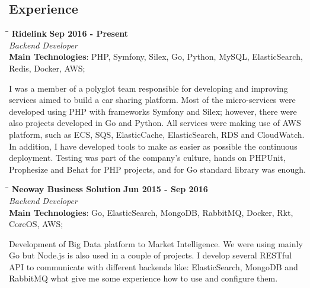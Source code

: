 \documentclass[margin]{res}
\begin{document}
\begin{resume}
\section{Experience}
\vspace{-0.1in}
    \begin{tabbing}
    \hspace{2.3in}\= \hspace{1.7in}\= \kill %
    \textbf{Ridelink}    \>\>\textbf{Sep 2016 - Present}\\
    \textit{Backend Developer}\\
    \textbf{Main Technologies}: PHP, Symfony, Silex, Go, Python, MySQL, ElasticSearch, \\Redis, Docker, AWS;
    \end{tabbing}\vspace{-20pt}      %
    \vspace{2mm}
I was a member of a polyglot team responsible for developing and improving services aimed to build a car sharing platform. Most of the micro-services were developed using PHP with frameworks Symfony and Silex; however, there were also projects developed in Go and Python. All services were making use of AWS platform, such as ECS, SQS, ElasticCache, ElasticSearch, RDS and CloudWatch. In addition, I have developed tools to make as easier as possible the continuous deployment. Testing was part of the company’s culture, hands on PHPUnit, Prophesize and Behat for PHP projects, and for Go standard library was enough.    

\vspace{-0.1in}
    \begin{tabbing}
    \hspace{2.3in}\= \hspace{1.7in}\= \kill %
    \textbf{Neoway Business Solution}    \>\>\textbf{Jun 2015 - Sep 2016}\\
    \textit{Backend Developer}\\
    \textbf{Main Technologies}: Go, ElasticSearch, MongoDB, RabbitMQ, Docker, Rkt,\\CoreOS, AWS;
    \end{tabbing}\vspace{-20pt}      %
    \vspace{2mm}
Development of Big Data platform to Market Intelligence. We were using mainly Go but Node.js is also used in a couple of projects. I develop several RESTful API to communicate with different backends like: ElasticSearch, MongoDB and RabbitMQ what give me some experience how to use and configure them.


\end{resume}
\end{document}
